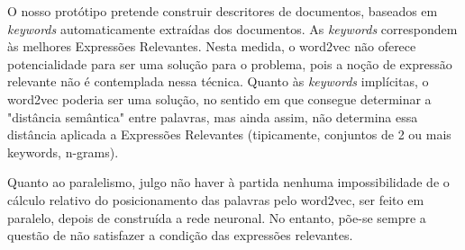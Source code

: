 O nosso protótipo pretende construir descritores de documentos, baseados em \textit{keywords} automaticamente extraídas dos documentos. As \textit{keywords} correspondem às melhores Expressões Relevantes. Nesta medida, o word2vec não oferece potencialidade para ser uma solução para o problema, pois a noção de expressão relevante não é contemplada nessa técnica. Quanto às \textit{keywords} implícitas, o word2vec poderia ser uma solução, no sentido em que consegue determinar a "distância semântica" entre palavras, mas ainda assim, não determina essa distância aplicada a Expressões Relevantes (tipicamente, conjuntos de 2 ou mais keywords, n-grams).

Quanto ao paralelismo, julgo não haver à partida nenhuma impossibilidade de o cálculo relativo do posicionamento das palavras pelo word2vec, ser feito em paralelo, depois de construída a rede neuronal. No entanto, põe-se sempre a questão de não satisfazer a condição das expressões relevantes.